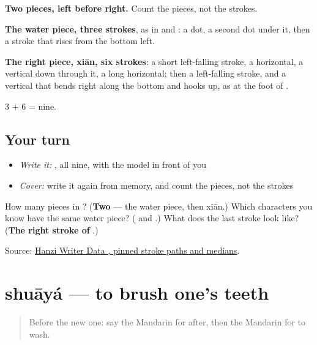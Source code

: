 \begin{quote}
\end{quote}

\textbf{Two pieces, left before right.} Count the pieces, not the strokes.

\textbf{The water piece, three strokes}, as in  and : a dot, a second dot under it, then a stroke that rises from the bottom left.

\textbf{The right piece, xiān, six strokes}: a short left-falling stroke, a horizontal, a vertical down through it, a long horizontal; then a left-falling stroke, and a vertical that bends right along the bottom and hooks up, as at the foot of .

3 + 6 = nine.

\subsection*{Your turn}
\begin{itemize}
\raggedright
  \item \emph{Write it:} , all nine, with the model in front of you
  \item \emph{Cover:} write it again from memory, and count the pieces, not the strokes
\end{itemize}

\begin{tcolorbox}[breakable,colback=teal!4,colframe=teal!35!black,title={Before you move on}]
How many pieces in ? (\textbf{Two} — the water piece, then xiān.) Which characters you know have the same water piece? (\textbf{} and \textbf{}.) What does the last stroke look like? (\textbf{The right stroke of }.)

Source: \href{https://raw.githubusercontent.com/chanind/hanzi-writer-data/68d10a4b21150cae5e1ebbd223eed289cf32d90c/data/\%E6\%B4\%97.json}{Hanzi Writer Data , pinned stroke paths and medians}.
\end{tcolorbox}
\section[shuāyá]{shuāyá — to brush one's teeth}

\label{lesson:ZH-C99-shuaya}



\begin{quote}
Before the new one: say the Mandarin for after, then the Mandarin for to wash.
\end{quote}

